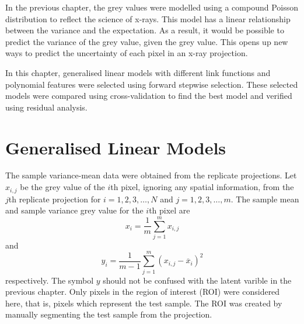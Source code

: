 In the previous chapter, the grey values were modelled using a compound Poisson distribution to reflect the science of x-rays. This model has a linear relationship between the variance and the expectation. As a result, it would be possible to predict the variance of the grey value, given the grey value. This opens up new ways to predict the uncertainty of each pixel in an x-ray projection.

In this chapter, generalised linear models \citep{nelder1972generalized, nelder1972generalized_2, mccullagh1984generalized} with different link functions and polynomial features were selected using forward stepwise selection. These selected models were compared using cross-validation to find the best model and verified using residual analysis.

\section{Generalised Linear Models}

The sample variance-mean data were obtained from the replicate projections. Let $x_{i,j}$ be the grey value of the $i$th pixel, ignoring any spatial information, from the $j$th replicate projection for $i=1,2,3,\ldots,N$ and $j=1,2,3,\ldots,m$. The sample mean and sample variance grey value for the $i$th pixel are
\begin{equation}
    x_{i}=\frac{1}{m}\sum_{j=1}^m x_{i,j}
\end{equation}
and
\begin{equation}
    y_{i} =
    \frac{1}{m-1}
    \sum_{j=1}^m
        \left(
            x_{i,j} - \overline{x}_{i}
        \right)^2
\end{equation}
respectively. The symbol $y$ should not be confused with the latent varible in the previous chapter. Only pixels in the region of interest (ROI) were considered here, that is, pixels which represent the test sample. The ROI was created by manually segmenting the test sample from the projection.

